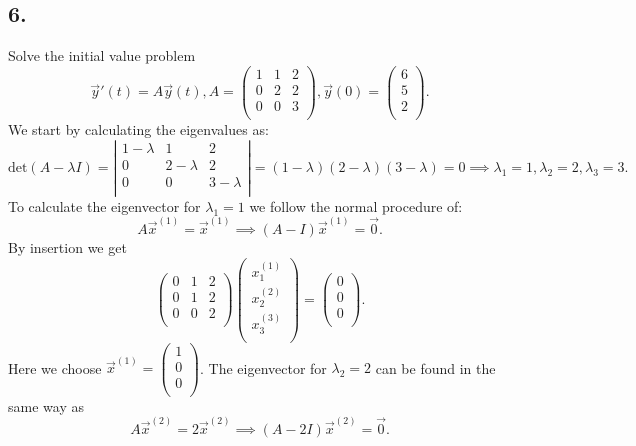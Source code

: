 \subsection*{6.} Solve the initial value problem
\[ 
\Vec{y}'(t) = A \Vec{y}(t), A = \begin{pmatrix}
1 & 1 & 2\\
0 & 2 & 2\\
0 & 0 & 3\\
\end{pmatrix}, \Vec{y}(0) = \begin{pmatrix}
6\\
5\\
2\\
\end{pmatrix}
.\]
\bigbreak
We start by calculating the eigenvalues as:
\[ 
\mathrm{det}(A - \lambda I) = \left| \begin{array}{ccc}
1 - \lambda & 1 & 2\\
0 & 2 - \lambda & 2\\
0 & 0 & 3 - \lambda\\
\end{array} \right| = (1 - \lambda)(2-\lambda)(3-\lambda) = 0 \implies \lambda_1 = 1, \lambda_2 = 2, \lambda_3 = 3
.\]
To calculate the eigenvector for $\lambda_1 = 1$ we follow the normal procedure of:
\[ 
A \Vec{x}^{(1)} = \Vec{x}^{(1)} \implies (A - I) \Vec{x}^{(1)} = \Vec{0}
.\]
By insertion we get
\[ 
\begin{pmatrix}
0 & 1 & 2\\
0 & 1 & 2\\
0 & 0 & 2\\
\end{pmatrix} \begin{pmatrix}
x_1^{(1)}\\
x_2^{(2)}\\
x_3^{(3)}\\
\end{pmatrix} = \begin{pmatrix}
0\\
0\\
0\\
\end{pmatrix}
.\]
Here we choose $\Vec{x}^{(1)} = \begin{pmatrix}
1\\
0\\
0\\
\end{pmatrix}$. The eigenvector for $\lambda_2 = 2$ can be found in the same way as
\[ 
A \Vec{x}^{(2)} = 2 \Vec{x}^{(2)} \implies (A - 2I) \Vec{x}^{(2)} = \Vec{0}
.\]
